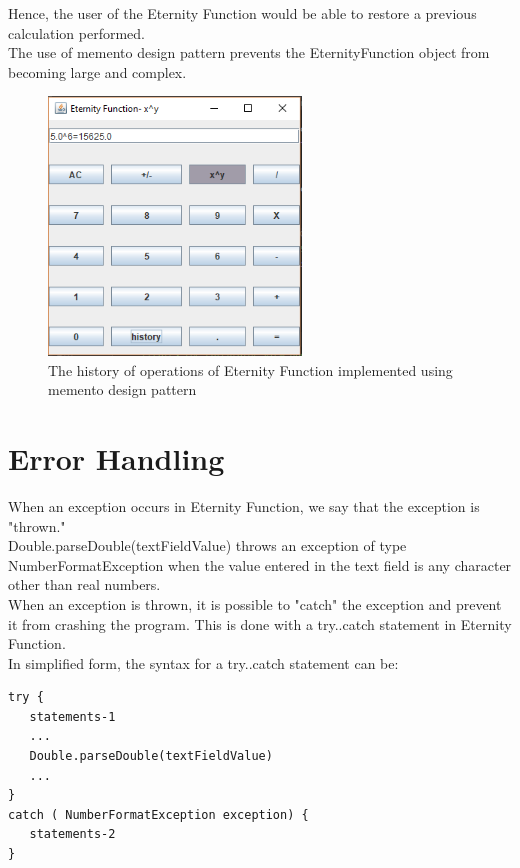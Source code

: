 \documentclass[11pt, english]{report}
\begin{document}
Hence, the user of the Eternity Function would be able to restore a previous calculation performed.\\

The use of memento design pattern prevents the EternityFunction object from becoming large and complex.\\

\begin{figure}[H]
  
  \includegraphics[width=0.6\textwidth]{d2.PNG}
  \centering
  \caption{The history of operations of Eternity Function implemented using memento design pattern
}
\end{figure}

\section{Error Handling}

When an exception occurs in Eternity Function, we say that the exception is "thrown."  \\

Double.parseDouble(textFieldValue) throws an exception of type NumberFormatException when the value entered in the text field is any character other than real numbers. \\

When an exception is thrown, it is possible to "catch" the exception and prevent it from crashing the program. This is done with a try..catch statement in Eternity Function. \\

In simplified form, the syntax for a try..catch statement can be:

\begin{lstlisting}
try {
   statements-1
   ...
   Double.parseDouble(textFieldValue)
   ...
}
catch ( NumberFormatException exception) {
   statements-2
}
\end{lstlisting}
\end{document}
